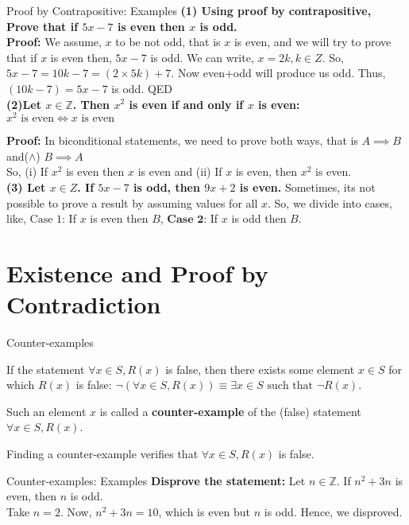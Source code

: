 \documentclass{beamer}
\begin{document}
\begin{frame}{Proof by Contrapositive: Examples}
\textbf{(1) Using proof by contrapositive, Prove that if $5x-7$ is even then $x$
is odd.}\\ 

\textbf{Proof:} We assume, $x$ to be not odd, that is $x$ is even, and we will
try to prove that if $x$ is even then, $5x-7$ is odd. We can write, $x=2k, k \in
Z$. So, $5x-7=10k-7=(2 \times 5k)+7$. Now even+odd will produce us odd. Thus,
$(10k-7)=5x-7$ is odd. QED \\

\textbf{(2)Let \( x \in \mathbb{Z} \). Then \( x^2 \) is even if and only if \(
x \) is even:
$
x^2 \text{ is even} \iff x \text{ is even}
$}

\textbf{Proof:} In biconditional statements, we need to prove both ways, that is
$A \implies B$ and($\wedge$) $B \implies A$\\ 
So, (i) If $x^2$ is even then $x$ is even and (ii) If $x$ is even, then $x^2$ is
even.\\ 

\textbf{(3) Let $x \in Z$. If $5x-7$ is odd, then $9x+2$ is even.}
\vspace{0.2cm}
Sometimes, its not possible to prove a result by assuming values for all $x$.
So, we divide into cases, like, $\text{Case 1:}$ If $x$ is even then $B$,
$\textbf{Case 2:}$ If $x$ is odd then $B$.
\end{frame}


\section{Existence and Proof by Contradiction}

\begin{frame}{Counter-examples}

If the statement $\forall x \in S, R(x)$ is false, then there exists some
element $x \in S$ for which $R(x)$ is false:  
$\neg (\forall x \in S, R(x)) \equiv \exists x \in S \text{ such that } \neg
R(x)$.  

Such an element $x$ is called a \textbf{counter-example} of the (false)
statement $\forall x \in S, R(x)$.  

Finding a counter-example verifies that $\forall x \in S, R(x)$ is false.

\end{frame}

\begin{frame}{Counter-examples: Examples}
\textbf{Disprove the statement:}  
Let $n \in \mathbb{Z}$.  If $n^2 + 3n$ is even, then $n$ is odd.\\ 

Take $n=2$. Now, $n^2 + 3n=10$, which is even but $n$ is odd. Hence, we disproved.

\end{frame}
\end{document}
